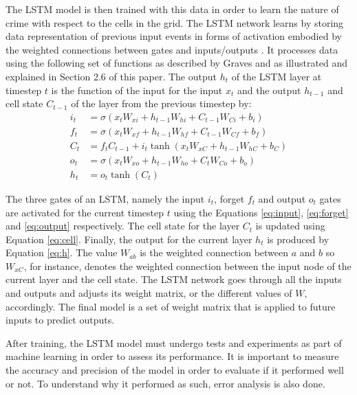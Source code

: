 The LSTM model is then trained with this data in order to learn the nature of crime with respect to the cells in the grid. The LSTM network learns by storing data representation of previous input events in forms of activation embodied by the weighted connections between gates and inputs/outputs \cite{hochreiter1997long}. It processes data using the following set of functions as described by Graves \cite{graves2013generating} and as illustrated and explained in Section 2.6 of this paper. The output \( h_t \) of the LSTM layer at timestep $t$ is the function of the input for the input \( x_t \) and the output \( h_{t-1} \) and cell state \( C_{t-1} \) of the layer from the previous timestep by:
    \begin{align}
    i_t &= \sigma(x_t W_{xi} + h_{t-1} W_{hi} + C_{t-1} W_{Ci} + b_i) \label{eq:input}\\
    f_t &= \sigma(x_t W_{xf} + h_{t-1} W_{hf} + C_{t-1} W_{Cf} + b_f) \label{eq:forget}\\
    C_t &= f_t C_{t-1} + i_t \tanh(x_t W_{xC} + h_{t-1} W_{hC} + b_C) \label{eq:cell}\\
    o_t &= \sigma(x_t W_{xo} + h_{t-1} W_{ho} + C_t W_{Co} + b_o) \label{eq:output} \\
    h_t &= o_t \tanh(C_t) \label{eq:h}
    \end{align}

The three gates of an LSTM, namely the input \( i_t \), forget \( f_t \) and output \( o_t \) gates are activated for the current timestep $t$ using the Equations \ref{eq:input}, \ref{eq:forget} and \ref{eq:output} respectively. The cell state for the layer \( C_t \) is updated using Equation \ref{eq:cell}. Finally, the output for the current layer \( h_t \) is produced by Equation \ref{eq:h}. The value \(W_{ab}\) is the weighted connection between $a$ and $b$ so \(W_{xC}\), for instance, denotes the weighted connection between the input node of the current layer and the cell state. The LSTM network goes through all the inputs and outputs and adjusts its weight matrix, or the different values of $W$, accordingly. The final model is a set of weight matrix that is applied to future inputs to predict outputs.

After training, the LSTM model must undergo tests and experiments as part of machine learning in order to assess its performance. It is important to measure the accuracy and precision of the model in order to evaluate if it performed well or not. To understand why it performed as such, error analysis is also done.


